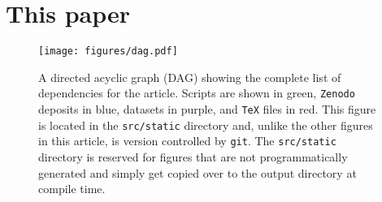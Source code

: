\documentclass[modern]{aastex631}
\begin{document}
\section{This paper}

\begin{figure}[ht!]
    \begin{centering}
        \texttt{[image: figures/dag.pdf]}
        \caption{
            A directed acyclic graph (DAG) showing the complete list of dependencies for the article. 
            Scripts are shown in green, \texttt{Zenodo} deposits in blue, datasets in purple, and \texttt{TeX} files in red.
            This figure is located in the \texttt{src/static} directory and, unlike the other figures in this article, is version controlled by \texttt{git}. The \texttt{src/static} directory is reserved for figures that are not programmatically generated and simply get copied over to the output directory at compile time.
        }
        \label{fig:dag}
    \end{centering}
\end{figure}


\end{document}
